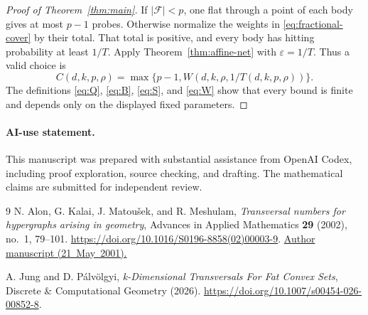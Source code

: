 \documentclass[11pt]{article}
\theoremstyle{remark}
\newcommand{\eps}{\varepsilon}
\begin{document}
\begin{proof}[Proof of Theorem~\ref{thm:main}]
If \(|\mathcal F|<p\), one flat through a point of each body gives at
most \(p-1\) probes.
Otherwise normalize the weights in \eqref{eq:fractional-cover}
by their total. That total is positive, and every body has hitting
probability at least \(1/T\).
Apply Theorem~\ref{thm:affine-net} with \(\eps=1/T\).
Thus a valid choice is
\[
 C(d,k,p,\rho)=\max\{p-1,W(d,k,\rho,1/T(d,k,p,\rho))\}.
\]
The definitions \eqref{eq:Q}, \eqref{eq:B}, \eqref{eq:S},
and \eqref{eq:W} show that every bound is finite and depends only on
the displayed fixed parameters.
\end{proof}

\paragraph{AI-use statement.}
This manuscript was prepared with substantial assistance from OpenAI
Codex, including proof exploration, source checking, and drafting.
The mathematical claims are submitted for independent review.

\begin{thebibliography}{9}
N. Alon, G. Kalai, J. Matou\v{s}ek, and R. Meshulam,
\emph{Transversal numbers for hypergraphs arising in geometry},
Advances in Applied Mathematics \textbf{29} (2002), no.~1, 79--101.
\url{https://doi.org/10.1016/S0196-8858(02)00003-9}.
\href{https://web.math.princeton.edu/~nalon/PDFS/akmm6.pdf}{Author manuscript (21~May~2001).}

A. Jung and D. P\'alv\"olgyi,
\emph{k-Dimensional Transversals For Fat Convex Sets},
Discrete \& Computational Geometry (2026).
\url{https://doi.org/10.1007/s00454-026-00852-8}.
\end{thebibliography}
\end{document}
